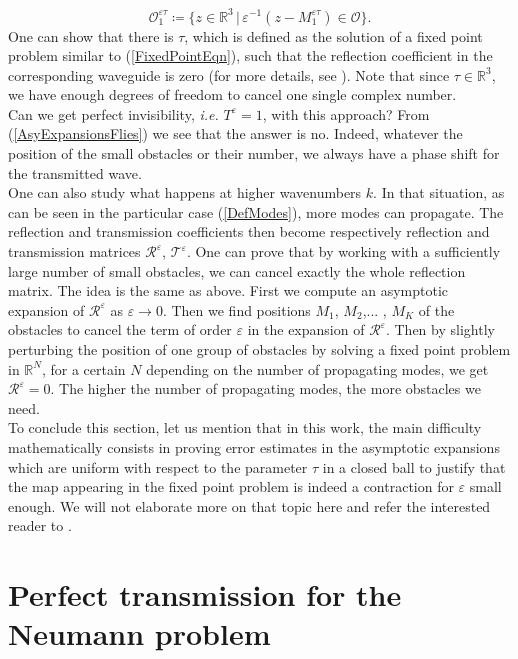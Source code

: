 \documentclass[11pt,a4paper]{report}
\newcommand{\eps}{\varepsilon}
\newcommand{\R}{\mathbb{R}}
\begin{document}
\[
\mathcal{O}^{\eps\tau}_1\coloneqq\{z\in\R^3\,|\,\eps^{-1}(z-M^{\eps\tau}_1)\in\mathcal{O}\}.
\]
One can show that there is $\tau$, which is defined as the solution of a fixed point problem similar to (\ref{FixedPointEqn}), such that the reflection coefficient in the corresponding waveguide is zero (for more details, see \cite{ChNa16}). Note that since $\tau\in\R^3$, we have enough degrees of freedom to cancel one single complex number.\\
\newline
Can we get perfect invisibility, \textit{i.e.} $T^\eps=1$, with this approach? From (\ref{AsyExpansionsFlies}) we see that the answer is no. Indeed, whatever the position of the small obstacles or their number, we always have a phase shift for the transmitted wave.\\
\newline
One can also study what happens at higher wavenumbers $k$. In that situation, as can be seen in the particular case  (\ref{DefModes}), more modes can propagate. The reflection and transmission coefficients then become respectively reflection and transmission matrices $\mathcal{R}^\eps$, $\mathcal{T}^\eps$. One can prove that by working with a sufficiently large number of small obstacles, we can cancel exactly the whole reflection matrix. The idea is the same as above. First we compute an asymptotic expansion of $\mathcal{R}^\eps$ as $\eps\to0$. Then we find positions $M_1$, $M_2$,... , $M_K$ of the obstacles to cancel the term of order $\eps$ in the expansion of $\mathcal{R}^\eps$. Then by slightly perturbing the position of one group of obstacles by solving a fixed point problem in $\R^N$, for a certain $N$ depending on the number of propagating modes, we get $\mathcal{R}^\eps=0$. The higher the number of propagating modes, the more obstacles we need.\\ 
\newline
To conclude this section, let us mention that in this work, the main difficulty mathematically consists in proving error estimates in the asymptotic expansions which are uniform with respect to the parameter $\tau$ in a closed ball to justify that the map appearing in the fixed point problem is indeed a contraction for $\eps$ small enough. We will not elaborate more on that topic here and refer the interested reader to \cite{ChNa16}. 
 

\section{Perfect transmission for the Neumann problem}\label{SectionTOne}
\end{document}
